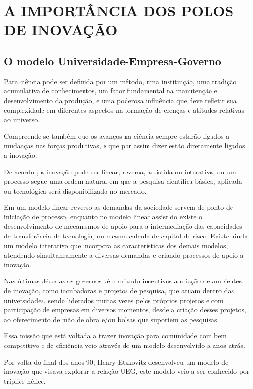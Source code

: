 \chapter{A IMPORTÂNCIA DOS POLOS DE INOVAÇÃO}
\thispagestyle{empty}

\section{O modelo Universidade-Empresa-Governo}

Para  ciência pode ser definida por um método, uma instituição, uma tradição acumulativa de conhecimentos, um fator fundamental na manutenção e desenvolvimento da produção, e uma poderosa influência que deve refletir sua complexidade em diferentes aspectos na formação de crenças e atitudes relativas ao universo.

Compreende-se também que os avanços na ciência sempre estarão ligados a mudanças nas forças produtivas, e que por assim dizer estão diretamente ligados a inovação.

De acordo , a inovação pode ser linear, reversa, assistida ou interativa, ou um processo segue uma ordem natural em que a pesquisa científica básica, aplicada ou tecnológica será disponibilizado no mercado.

Em um modelo linear reverso as demandas da sociedade servem de ponto de iniciação de processo, enquanto no modelo linear assistido existe o desenvolvimento de mecanismos de apoio para a intermediação das capacidades de transferência de tecnologia, ou mesmo calculo de capital de risco. Existe ainda um modelo interativo que incorpora as características dos demais modelos, atendendo simultaneamente a diversas demandas e criando processos de apoio a inovação.

Nas últimas décadas os governos vêm criando incentivos a criação de ambientes de inovação, como incubadoras e projetos de pesquisa, que atuam dentro das universidades, sendo liderados muitas vezes pelos próprios projetos e com participação de empresas em diversos momentos, desde a criação desses projetos, ao oferecimento de mão de obra e/ou bolsas que suportem as pesquisas.

Essa missão que está voltada a trazer inovação para comunidade com bem competitivo e de eficiência veio através de um modelo desenvolvido a anos atrás.

Por volta do final dos anos 90, Henry Etzkovitz desenvolveu um modelo de inovação que visava explorar a relação UEG, este modelo veio a ser conhecido por tríplice hélice.

